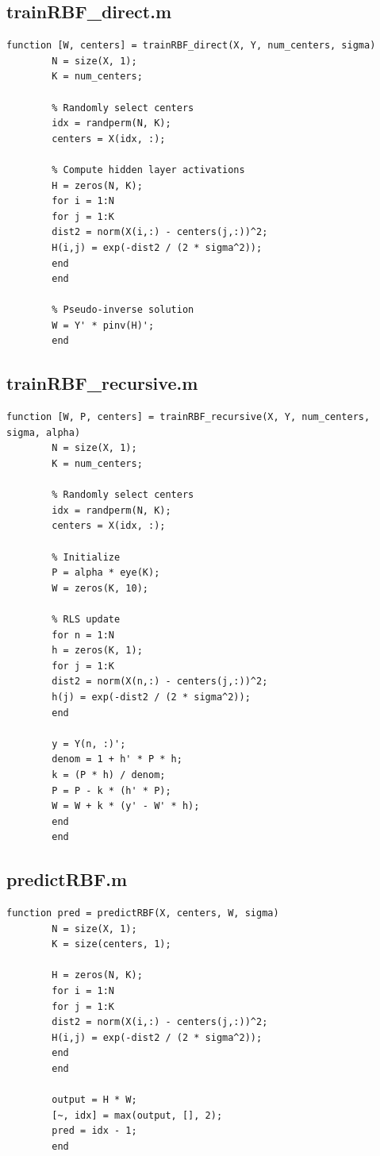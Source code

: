 \documentclass[12pt]{article}
\begin{document}
	\subsection*{trainRBF\_direct.m}
	
	\begin{lstlisting}[caption=trainRBF\_direct.m]
		function [W, centers] = trainRBF_direct(X, Y, num_centers, sigma)
		N = size(X, 1);
		K = num_centers;
		
		% Randomly select centers
		idx = randperm(N, K);
		centers = X(idx, :);
		
		% Compute hidden layer activations
		H = zeros(N, K);
		for i = 1:N
		for j = 1:K
		dist2 = norm(X(i,:) - centers(j,:))^2;
		H(i,j) = exp(-dist2 / (2 * sigma^2));
		end
		end
		
		% Pseudo-inverse solution
		W = Y' * pinv(H)';
		end
	\end{lstlisting}
	
	\subsection*{trainRBF\_recursive.m}
	
	\begin{lstlisting}[caption=trainRBF\_recursive.m]
		function [W, P, centers] = trainRBF_recursive(X, Y, num_centers, sigma, alpha)
		N = size(X, 1);
		K = num_centers;
		
		% Randomly select centers
		idx = randperm(N, K);
		centers = X(idx, :);
		
		% Initialize
		P = alpha * eye(K);
		W = zeros(K, 10);
		
		% RLS update
		for n = 1:N
		h = zeros(K, 1);
		for j = 1:K
		dist2 = norm(X(n,:) - centers(j,:))^2;
		h(j) = exp(-dist2 / (2 * sigma^2));
		end
		
		y = Y(n, :)';
		denom = 1 + h' * P * h;
		k = (P * h) / denom;
		P = P - k * (h' * P);
		W = W + k * (y' - W' * h);
		end
		end
	\end{lstlisting}
	
	\subsection*{predictRBF.m}
	
	\begin{lstlisting}[caption=predictRBF.m]
		function pred = predictRBF(X, centers, W, sigma)
		N = size(X, 1);
		K = size(centers, 1);
		
		H = zeros(N, K);
		for i = 1:N
		for j = 1:K
		dist2 = norm(X(i,:) - centers(j,:))^2;
		H(i,j) = exp(-dist2 / (2 * sigma^2));
		end
		end
		
		output = H * W;
		[~, idx] = max(output, [], 2);
		pred = idx - 1;
		end
	\end{lstlisting}
	
\end{document}
